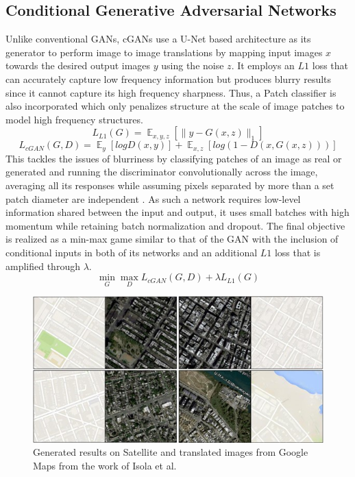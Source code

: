 \documentclass{Configuration_Files/PoliMi3i_thesis}
\begin{document}
\subsection{Conditional Generative Adversarial Networks}
Unlike conventional GANs, cGANs use a U-Net based architecture as its generator to 
perform image to image translations by mapping input images $x$ towards the 
desired output images $y$ using the noise $z$. It employs an $L1$ loss that can accurately 
capture low frequency information but produces blurry results since it cannot capture its high frequency 
sharpness. Thus, a Patch classifier is also incorporated which only penalizes structure at the scale 
of image patches to model high frequency structures. 
\begin{equation} \label{eq:l1loss}
L_{L1}(G) =  \mathop{{}\mathbb{E}}_{x,y,z}[\|y-G(x,z)\|_{1}]
\end{equation}
\begin{equation} \label{eq:patchloss}
L_{cGAN}(G,D) =  \mathop{{}\mathbb{E}}_{y}[logD(x,y)] +  \mathop{{}\mathbb{E}}_{x,z}[log(1-D(x,G(x,z)))]
\end{equation}
This tackles the issues of blurriness by classifying patches of an image as real or generated and running 
the discriminator convolutionally across the image, averaging all its responses while assuming pixels 
separated by more than a set patch diameter are independent \cite{PhI17}. As such a network 
requires low-level information shared between the input and output, it uses small 
batches with high momentum while retaining batch normalization and dropout. The final objective is
realized as a min-max game similar to that of the GAN with the inclusion of conditional inputs in both of its networks 
and an additional $L1$ loss that is amplified through $\lambda$.
\begin{equation} \label{eq:cganminmax}
\min_{G}\max_{D}L_{cGAN}(G,D)+\lambda L_{L1}(G)
\end{equation}
\begin{figure}[H]
    \centering
    \includegraphics[width=1\textwidth]{cgan_results.jpg}
    \caption[Generated Google Maps images from the work of Isola et al.]{Generated results on Satellite and translated images from Google Maps from the work of Isola et al.}
    \label{fig:cganresults}
\end{figure}
\end{document}
